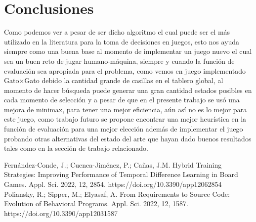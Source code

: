 \documentclass[runningheads]{llncs}
\begin{document}
\section{Conclusiones}
Como podemos ver a pesar de ser dicho algoritmo el cual puede ser el más utilizado en la literatura para la toma de decisiones en juegos, esto nos ayuda siempre como una buena base al momento de implementar un juego nuevo el cual sea un buen reto de jugar humano-máquina, siempre y cuando la función de evaluación sea apropiada para el problema, como vemos en juego implementado Gato$\times$Gato debido la cantidad grande de casillas en el tablero global, al momento de hacer búsqueda puede generar una gran cantidad estados posibles en cada momento de selección y a pesar de que en el presente trabajo se usó una mejora de minimax, para tener una mejor eficiencia, aún así no es lo mejor para este juego, como trabajo futuro se propone encontrar una mejor heurística en la función de evaluación para una mejor elección además de implementar el juego probando otras alternativas del estado del arte que hayan dado buenos resultados tales como en la sección de trabajo relacionado.
%
%
%
% 
% 
%
\begin{thebibliography}{8}
Fernández-Conde, J.; Cuenca-Jiménez, P.; Cañas, J.M. Hybrid Training Strategies: Improving Performance of Temporal Difference Learning in Board Games. Appl. Sci. 2022, 12, 2854. https://doi.org/10.3390/app12062854
Poliansky, R.; Sipper, M.; Elyasaf, A. From Requirements to Source Code: Evolution of Behavioral Programs. Appl. Sci. 2022, 12, 1587. https://doi.org/10.3390/app12031587

\end{thebibliography}
\end{document}
